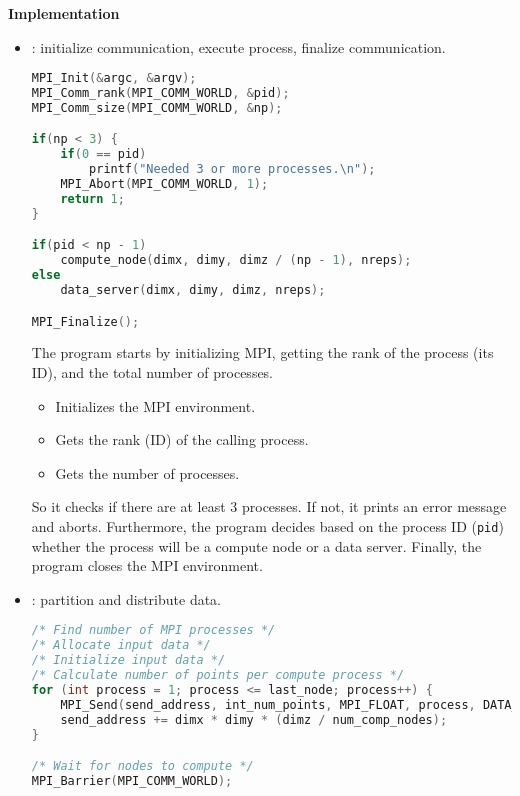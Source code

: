 \highspace
\begin{flushleft}
    \textcolor{Green3}{ \textbf{Implementation}}
\end{flushleft}
\begin{itemize}
    \item {}: initialize communication, execute process, finalize communication.
    \begin{lstlisting}[language=C++]
MPI_Init(&argc, &argv);
MPI_Comm_rank(MPI_COMM_WORLD, &pid);
MPI_Comm_size(MPI_COMM_WORLD, &np);

if(np < 3) {
    if(0 == pid)
        printf("Needed 3 or more processes.\n");
    MPI_Abort(MPI_COMM_WORLD, 1);
    return 1;
}

if(pid < np - 1)
    compute_node(dimx, dimy, dimz / (np - 1), nreps);
else
    data_server(dimx, dimy, dimz, nreps);

MPI_Finalize();\end{lstlisting}
    
    The program starts by initializing MPI, getting the rank of the process (its ID), and the total number of processes.
    \begin{itemize}
        \item Initializes the MPI environment.
        \item Gets the rank (ID) of the calling process.
        \item Gets the number of processes.
    \end{itemize}
    
    So it checks if there are at least 3 processes. If not, it prints an error message and aborts. Furthermore, the program decides based on the process ID (\texttt{pid}) whether the process will be a compute node or a data server. Finally, the program closes the MPI environment.

    \item {}: partition and distribute data.
    \begin{lstlisting}[language=C++]
/* Find number of MPI processes */
/* Allocate input data */
/* Initialize input data */
/* Calculate number of points per compute process */
for (int process = 1; process <= last_node; process++) {
    MPI_Send(send_address, int_num_points, MPI_FLOAT, process, DATA_DISTRIBUTE, MPI_COMM_WORLD);
    send_address += dimx * dimy * (dimz / num_comp_nodes);
}

/* Wait for nodes to compute */
MPI_Barrier(MPI_COMM_WORLD);


\end{lstlisting}
\end{itemize}
